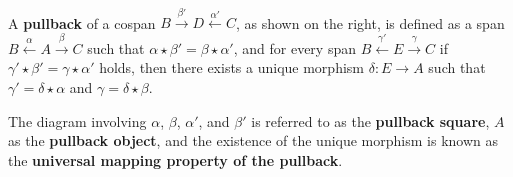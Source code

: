  
\begin{definition}
    \label{def:cat:pb}
    \ \newline
\noindent
\begin{minipage}{0.7\textwidth}  
   A \textbf{pullback} of a cospan \(B \overset{\beta'}{\rightarrow} D \overset{\alpha'}{\leftarrow} C \), as shown on the right, is defined as a span \( B \overset{\alpha}{\leftarrow} A \overset{\beta}{\rightarrow} C \) such that \( \alpha \mathop{\star} \beta' \mathop{=} \beta \mathop{\star} \alpha' \), and for every span \( B \overset{\gamma'}{\leftarrow} E \overset{\gamma}{\rightarrow} C \) if \(\gamma' \mathop{\star} \beta' \mathop{=} \gamma \mathop{\star} \alpha'\) holds, then there exists a unique morphism \(\delta: E \mathop{\to} A\) such that $\gamma' \mathop{=} \delta \mathop{\star} \alpha$ and $\gamma \mathop{=} \delta \mathop{\star} \beta$. 
\end{minipage}
\hfill
\begin{minipage}{0.299\textwidth}
    \hfill
{}
\end{minipage}
The diagram involving \(\alpha\), \(\beta\), \(\alpha'\), and \(\beta'\) is referred to as the \textbf{pullback square}, \(A\) as the \textbf{pullback object}, and the existence of the unique morphism is known as the \textbf{universal mapping property of the pullback}.
\end{definition} 